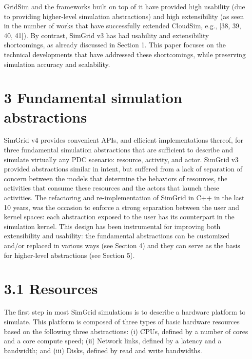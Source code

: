 \documentclass[
]{article}
\begin{document}
GridSim and the frameworks built on top of it have provided high
usability (due to providing higher-level simulation abstractions) and
high extensibility (as seen in the number of works that have
successfully extended CloudSim, e.g., {[}38, 39, 40, 41{]}). By
contrast, SimGrid v3 has had usability and extensibility shortcomings,
as already discussed in Section 1. This paper focuses on the technical
developments that have addressed these shortcomings, while preserving
simulation accuracy and scalability.

\section{3 Fundamental simulation
abstractions}\label{fundamental-simulation-abstractions}

SimGrid v4 provides convenient APIs, and efficient implementations
thereof, for three fundamental simulation abstractions that are
sufficient to describe and simulate virtually any PDC scenario:
resource, activity, and actor. SimGrid v3 provided abstractions similar
in intent, but suffered from a lack of separation of concern between the
models that determine the behaviors of resources, the activities that
consume these resources and the actors that launch these activities. The
refactoring and re-implementation of SimGrid in C++ in the last 10
years, was the occasion to enforce a strong separation between the user
and kernel spaces: each abstraction exposed to the user has its
counterpart in the simulation kernel. This design has been instrumental
for improving both extensibility and usability: the fundamental
abstractions can be customized and/or replaced in various ways (see
Section 4) and they can serve as the basis for higher-level abstractions
(see Section 5).

\section{3.1 Resources}\label{resources}

The first step in most SimGrid simulations is to describe a hardware
platform to simulate. This platform is composed of three types of basic
hardware resources based on the following three abstractions: (i) CPUs,
defined by a number of cores and a core compute speed; (ii) Network
links, defined by a latency and a bandwidth; and (iii) Disks, defined by
read and write bandwidths.
\end{document}
